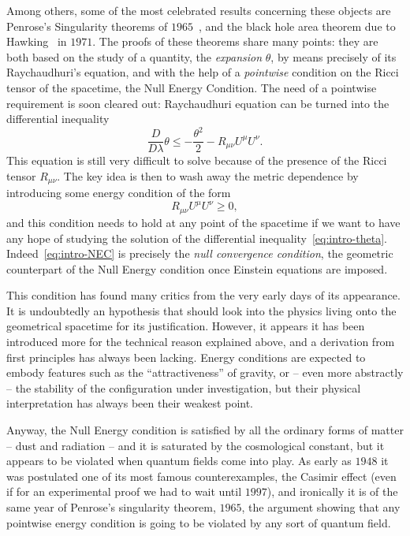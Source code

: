 Among others, some of the most celebrated results concerning these objects are Penrose's Singularity theorems of \(1965\)~\cite[]{penrose1965gravitational}, and the black hole area theorem due to Hawking~\cite[]{hawking1972black} in \(1971\). The proofs of these theorems share many points: they are both based on the study of a quantity, the \emph{expansion} \(\theta\), by means precisely of its Raychaudhuri's equation, and with the help of a \emph{pointwise} condition on the Ricci tensor of the spacetime, the Null Energy Condition. The need of a pointwise requirement is soon cleared out: Raychaudhuri equation can be turned into the differential inequality
\begin{equation}
    \label{eq:intro-theta}
    \frac{D}{D\lambda}\theta \le -\frac{\theta^2}{2} - R_{\mu\nu}U^{\mu}U^{\nu}.
\end{equation}
This equation is still very difficult to solve because of the presence of the Ricci tensor \(R_{\mu\nu}\). The key idea is then to wash away the metric dependence by introducing some energy condition of the form 
\begin{equation}
    \label{eq:intro-NEC}
    R_{\mu\nu}U^{\mu}U^{\nu}\ge 0,
\end{equation}
and this condition needs to hold at any point of the spacetime if we want to have any hope of studying the solution of the differential inequality~\eqref{eq:intro-theta}. Indeed~\eqref{eq:intro-NEC} is precisely the \emph{null convergence condition}, the geometric counterpart of the Null Energy condition once Einstein equations are imposed.

This condition has found many critics from the very early days of its appearance. It is undoubtedly an hypothesis that should look into the physics living onto the geometrical spacetime for its justification. However, it appears it has been introduced more for the technical reason explained above, and a derivation from first principles has always been lacking. Energy conditions are expected to embody features such as the ``attractiveness'' of gravity, or -- even more abstractly -- the stability of the configuration under investigation, but their physical interpretation has always been their weakest point.

Anyway, the Null Energy condition is satisfied by all the ordinary forms of matter -- dust and radiation -- and it is saturated by the cosmological constant, but it appears to be violated when quantum fields come into play.
As early as \(1948\) it was postulated one of its most famous counterexamples, the Casimir effect (even if for an experimental proof we had to wait until \(1997\)), and ironically it is of the same year of Penrose's singularity theorem, \(1965\), the argument showing that any pointwise energy condition is going to be violated by any sort of quantum field.

